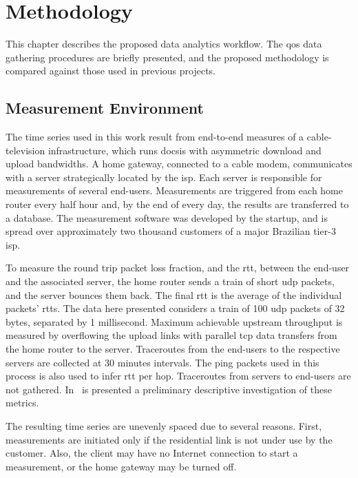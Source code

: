 \chapter{Methodology}
\label{chap:methodology}

This chapter describes the proposed data analytics workflow.
The \gls*{qos} data gathering procedures are briefly presented,
and the proposed methodology is compared against those used in
previous projects.

\section{Measurement Environment}

The time series used in this work result from end-to-end measures of a
cable-television infrastructure, which runs \gls*{docsis} with asymmetric download and
upload bandwidths. A home gateway, connected to a cable modem, communicates
with a server strategically located by the \gls*{isp}.
Each server is responsible for measurements of several end-users.
Measurements are triggered from
each home router every half hour and, by the end of every day,
the results are transferred to a database.
The measurement software was
developed by the startup,
and is spread over approximately two thousand customers of a major Brazilian
tier-3 \gls*{isp}.

To measure the round
trip packet loss fraction, and the \gls*{rtt}, between the end-user and the associated
server, the home router sends a train of short \gls*{udp} packets, and the server
bounces them back.
The final \gls*{rtt} is the average of the individual packets' \gls*{rtt}s.
The data here presented considers a train of 100 \gls*{udp} packets of 32 bytes,
separated by 1 millisecond.
Maximum achievable upstream throughput is measured by overflowing the upload
links with parallel \gls*{tcp} data transfers from the home router to the server.
Traceroutes from the end-users to the respective servers are collected
at 30 minutes intervals.
The ping packets used in this process is also used to infer \gls*{rtt} per hop.
Traceroutes from servers to end-users are not gathered.
In~\cite{a_preliminary_performance_measurement_study_of_residential_broadband_services_in_brazil}
is presented a preliminary descriptive investigation of these metrics.

The resulting time series are unevenly spaced due to several reasons. First,
measurements are initiated only if the residential link is not under use by the
customer. Also, the client may have no Internet connection to start a
measurement, or the home gateway may be turned off.

